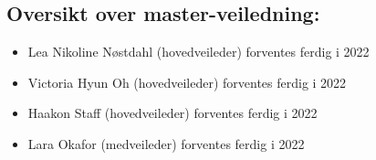 \documentclass[11pt]{article}
\begin{document}
\subsection*{Oversikt over master-veiledning:}
\label{sec-4-2}
\begin{itemize}
\item Lea Nikoline Nøstdahl (hovedveileder) forventes ferdig i 2022
\item Victoria Hyun Oh (hovedveileder) forventes ferdig i 2022
\item Haakon Staff (hovedveileder) forventes ferdig i 2022
\item Lara Okafor (medveileder) forventes ferdig i 2022
\end{itemize}
\end{document}
